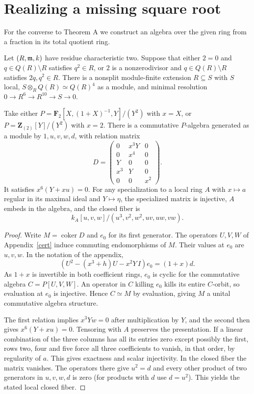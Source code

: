 \section{Realizing a missing square root}\label{construction}
For the converse to Theorem A we construct an algebra over the given ring from a fraction in its total quotient ring.
\begin{theorem}\label{realize}
Let $(R,\mathfrak m,k)$ have residue characteristic two. Suppose that either
$2=0$ and $q\in Q(R)\setminus R$ satisfies $q^2\in R$, or
$2$ is a nonzerodivisor and $q\in Q(R)\setminus R$ satisfies $2q,q^2\in R$.
There is a nonsplit module-finite extension $R\subseteq S$ with $S$ local,
$S\otimes_R Q(R)\simeq Q(R)^4$ as a module, and minimal resolution
$0\to R^6\to R^{10}\to S\to0$.
\end{theorem}
\begin{lemma}\label{model}
Take either $P=\mathbf F_2[X,(1+X)^{-1},Y]/(Y^2)$ with $x=X$, or $P=\mathbf Z_{(2)}[Y]/(Y^2)$ with $x=2$. There is a commutative $P$-algebra generated as a module by $1,u,v,w,d$, with relation matrix
\[
 D=\begin{pmatrix}0&x^3Y&0\\0&x^4&0\\Y&0&0\\x^3&Y&0\\0&0&x^2\end{pmatrix}.
\]
It satisfies $x^6(Y+xu)=0$. For any specialization to a local ring $A$ with $x\mapsto a$ regular in its maximal ideal and $Y\mapsto\eta$, the specialized matrix is injective, $A$ embeds in the algebra, and the closed fiber is
\[
 k_A[u,v,w]/(u^3,v^2,w^2,uv,uw,vw).
\]
\end{lemma}
\begin{proof}
Write $M=\operatorname{coker}D$ and $e_0$ for its first generator. The operators $U,V,W$ of Appendix~\ref{cert} induce commuting endomorphisms of $M$. Their values at $e_0$ are $u,v,w$. In the notation of the appendix,
\[
 (U^2-(x^3+h)U-x^2Y\,I)e_0=(1+x)d.
\]
As $1+x$ is invertible in both coefficient rings, $e_0$ is cyclic for the commutative algebra $C=P[U,V,W]$. An operator in $C$ killing $e_0$ kills its entire $C$-orbit, so evaluation at $e_0$ is injective. Hence $C\simeq M$ by evaluation, giving $M$ a unital commutative algebra structure.

The first relation implies $x^3Yw=0$ after multiplication by $Y$, and the second then gives $x^6(Y+xu)=0$. Tensoring with $A$ preserves the presentation. If a linear combination of the three columns has all its entries zero except possibly the first, rows two, four and five force all three coefficients to vanish, in that order, by regularity of $a$. This gives exactness and scalar injectivity. In the closed fiber the matrix vanishes. The operators there give $u^2=d$ and every other product of two generators in $u,v,w,d$ is zero (for products with $d$ use $d=u^2$). This yields the stated local closed fiber.
\end{proof}
